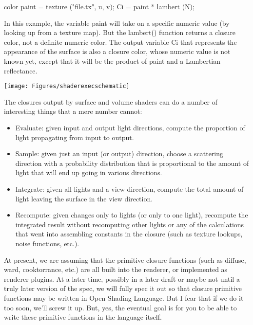 \documentclass[11pt,letterpaper]{book}
\def\langname{Open Shading Language\xspace}
\def\color{{\cf color}\xspace}
\def\colorclosure{{\cf closure color}\xspace}
\begin{document}
\begin{code}
    color paint = texture ("file.tx", u, v);
    Ci = paint * lambert (N);
\end{code}

\noindent In this example, the variable {\cf paint} will take on a
specific numeric value (by looking up from a texture map).  But the {\cf
  lambert()} function returns a \colorclosure, not a definite numeric
\color.  The output variable {\cf Ci} that represents the appearance of
the surface is also a \colorclosure, whose numeric value is not known
yet, except that it will be the product of {\cf paint} and a Lambertian
reflectance.

\bigskip

\texttt{[image: Figures/shaderexecschematic]}

\medskip

The closures output by surface and volume shaders can do a number of
interesting things that a mere number cannot:

\begin{itemize}
\item Evaluate: given input and output light directions, compute the
  proportion of light propagating from input to output.
\item Sample: given just an input (or output) direction, choose a
  scattering direction with a probability distribution that is
  proportional to the amount of light that will end up going in various
  directions.
\item Integrate: given all lights and a view direction, compute
  the total amount of light leaving the surface in the view direction.
\item Recompute: given changes only to lights (or only to one light),
  recompute the integrated result without recomputing other lights or
  any of the calculations that went into assembling constants in the
  closure (such as texture lookups, noise functions, etc.).
\end{itemize}

\begin{annotate}
At present, we are assuming that the primitive closure functions (such
as {\cf diffuse}, {\cf ward}, {\cf cooktorrance}, etc.) are all built
into the renderer, or implemented as renderer plugins.  At a later time,
possibly in a later draft or maybe not until a truly later version of
the spec, we will fully spec it out so that closure primitive functions
may be written in \langname.  But I fear that if we do it too soon,
we'll screw it up.  But, yes, the eventual goal is for you to be able to
write these primitive functions in the language itself.
\end{annotate}
\end{document}

